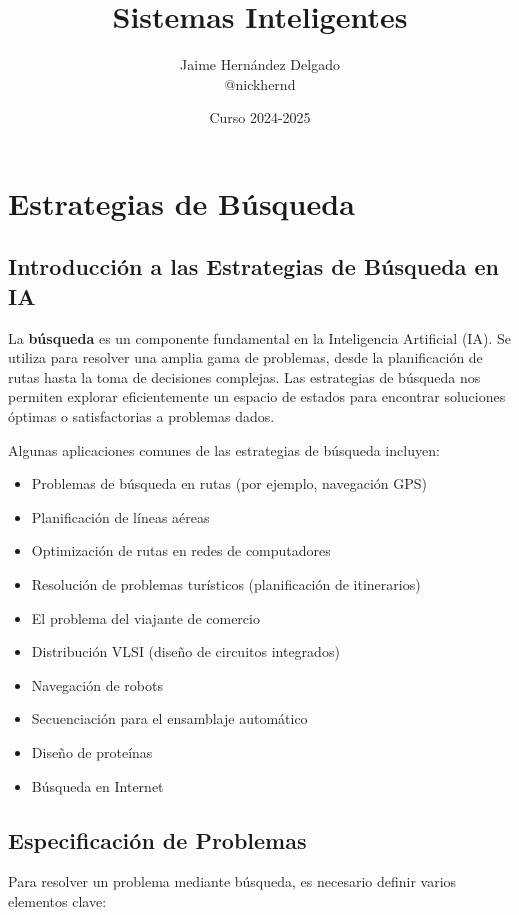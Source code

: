 \documentclass[12pt,a4paper]{report}
\title{Sistemas Inteligentes}
\author{Jaime Hernández Delgado\\
@nickhernd}
\date{Curso 2024-2025}
\begin{document}
	
	\maketitle
	
	\tableofcontents
	
	
	\chapter{Estrategias de Búsqueda}
	
	\section{Introducción a las Estrategias de Búsqueda en IA}
	
	La \textbf{búsqueda} es un componente fundamental en la Inteligencia Artificial (IA). Se utiliza para resolver una amplia gama de problemas, desde la planificación de rutas hasta la toma de decisiones complejas. Las estrategias de búsqueda nos permiten explorar eficientemente un espacio de estados para encontrar soluciones óptimas o satisfactorias a problemas dados.
	
	Algunas aplicaciones comunes de las estrategias de búsqueda incluyen:
	
	\begin{itemize}
		\item Problemas de búsqueda en rutas (por ejemplo, navegación GPS)
		\item Planificación de líneas aéreas
		\item Optimización de rutas en redes de computadores
		\item Resolución de problemas turísticos (planificación de itinerarios)
		\item El problema del viajante de comercio
		\item Distribución VLSI (diseño de circuitos integrados)
		\item Navegación de robots
		\item Secuenciación para el ensamblaje automático
		\item Diseño de proteínas
		\item Búsqueda en Internet
	\end{itemize}
	
	\section{Especificación de Problemas}
	
	Para resolver un problema mediante búsqueda, es necesario definir varios elementos clave:
	
\end{document}
